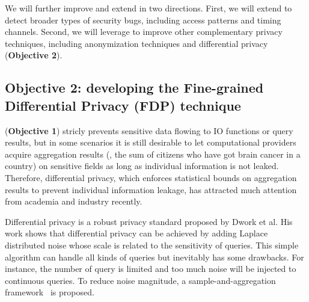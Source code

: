 




 We will further improve and extend \kakute in 
two directions. First, we will extend \kakute to detect broader types of
security bugs, including access patterns and timing channels. Second, we will 
leverage \kakute to improve other complementary privacy techniques, including 
anonymization techniques and differential privacy (\textbf{Objective 2}). 

\vspace{-.15in}\subsection{Objective 2: developing the Fine-grained 
Differential Privacy (FDP) technique}\label{sec:obj2}\vspace{-.075in}



\kakute (\textbf{Objective 1}) stricly prevents
sensitive data flowing to IO functions or query results, but in some scenarios 
it is still desirable to let computational providers acquire aggregation 
results (\eg, the sum of citizens who have got brain cancer in a country) 
on sensitive fields as long as individual information is not leaked. Therefore, 
differential privacy, which enforces statistical
bounds on aggregation results to prevent individual information leakage, has 
attracted much attention from academia and industry recently.

Differential privacy is a robust privacy standard proposed by Dwork et
al\cite{Dwork2006Differential, Dwork2008Differential, Dwork2011a}.
His work shows that differential privacy can be achieved by adding
Laplace distributed noise whose scale is related to the sensitivity of queries.
This simple algorithm can handle all kinds of queries but inevitably has some
drawbacks. For instance, the number of query is limited and too much noise will
be injected to continuous queries. To reduce noise magnitude, a 
sample-and-aggregation
framework~\cite{differentialdp:stoc11} is proposed.

